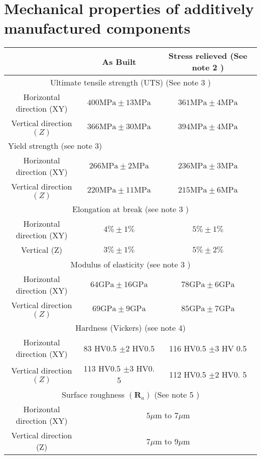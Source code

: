 \documentclass[10pt]{article}
\begin{document}
\section*{Mechanical properties of additively manufactured components}
\begin{center}
\begin{tabular}{|c|c|c|}
\hline
 & As Built & Stress relieved (See note 2 ) \\
\hline
\multicolumn{3}{|c|}{Ultimate tensile strength (UTS) (See note 3 )} \\
\hline
Horizontal direction (XY) & $400 \mathrm{MPa} \pm 13 \mathrm{MPa}$ & $361 \mathrm{MPa} \pm 4 \mathrm{MPa}$ \\
\hline
Vertical direction $(Z)$ & $366 \mathrm{MPa} \pm 30 \mathrm{MPa}$ & $394 \mathrm{MPa} \pm 4 \mathrm{MPa}$ \\
\hline
\multicolumn{3}{|l|}{Yield strength (see note 3)} \\
\hline
Horizontal direction (XY) & $266 \mathrm{MPa} \pm 2 \mathrm{MPa}$ & $236 \mathrm{MPa} \pm 3 \mathrm{MPa}$ \\
\hline
Vertical direction $(Z)$ & $220 \mathrm{MPa} \pm 11 \mathrm{MPa}$ & $215 \mathrm{MPa} \pm 6 \mathrm{MPa}$ \\
\hline
\multicolumn{3}{|c|}{Elongation at break (see note 3 )} \\
\hline
Horizontal direction (XY) & $4 \% \pm 1 \%$ & $5 \% \pm 1 \%$ \\
\hline
Vertical (Z) & $3 \% \pm 1 \%$ & $5 \% \pm 2 \%$ \\
\hline
\multicolumn{3}{|c|}{Modulus of elasticity (see note 3 )} \\
\hline
Horizontal direction (XY) & $64 \mathrm{GPa} \pm 16 \mathrm{GPa}$ & $78 \mathrm{GPa} \pm 6 \mathrm{GPa}$ \\
\hline
Vertical direction $(Z)$ & $69 \mathrm{GPa} \pm 9 \mathrm{GPa}$ & $85 \mathrm{GPa} \pm 7 \mathrm{GPa}$ \\
\hline
\multicolumn{3}{|c|}{Hardness (Vickers) (see note 4)} \\
\hline
Horizontal direction (XY) & 83 HV0.5 $\pm 2$ HV0.5 & 116 HV0.5 $\pm 3$ HV 0.5 \\
\hline
Vertical direction $(Z)$ & 113 HV0.5 $\pm 3$ HV0. 5 & 112 HV0.5 $\pm 2$ HV0. 5 \\
\hline
\multicolumn{3}{|c|}{Surface roughness $\left(\mathbf{R}_{a}\right)$ (See note 5 )} \\
\hline
Horizontal direction (XY) & \multicolumn{2}{|c|}{$5 \mu \mathrm{m}$ to $7 \mu \mathrm{m}$} \\
\hline
Vertical direction (Z) & \multicolumn{2}{|c|}{$7 \mu \mathrm{m}$ to $9 \mu \mathrm{m}$} \\
\hline
\end{tabular}
\end{center}
\end{document}
